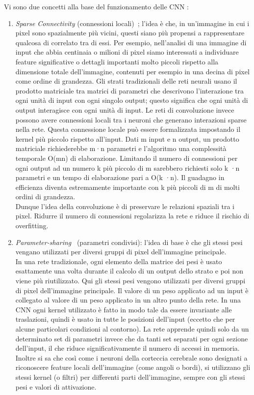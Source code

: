 Vi sono due concetti alla base del funzionamento delle CNN :\\
\begin{enumerate}
     \item \emph{Sparse Connectivity} (connessioni locali)~\cite{sparse}; l’idea è che, in un'immagine in cui i pixel sono spazialmente più vicini, questi siano
 più propensi a rappresentare
 qualcosa di correlato tra di essi. 
Per esempio, nell’analisi di una immagine di input che abbia centinaia o milioni di pixel 
siamo interessati a individuare feature significative o dettagli importanti molto piccoli
 rispetto alla dimensione totale dell’immagine, contenuti per esempio in una decina di pixel 
 come ordine di grandezza.
Gli strati tradizionali delle reti neurali usano il prodotto matriciale tra matrici di parametri
 che descrivono l’interazione tra ogni unità di input con ogni singolo output; questo significa
  che ogni unità di output interagisce con ogni unità di input.
   Le reti di convoluzione invece possono avere connessioni locali tra i neuroni che generano 
   interazioni sparse nella rete. Questa connessione locale può essere formalizzata impostando 
   il kernel più piccolo rispetto all'input. 
Dati m input e n output, un prodotto matriciale richiederebbe m·n parametri e l’algoritmo 
una complessità temporale O(mn) di elaborazione. Limitando il numero di connessioni per ogni 
output ad un numero k più piccolo di m sarebbero richiesti solo k ·n parametri e un tempo di 
elaborazione pari a O(k ·n). Il guadagno in efficienza diventa estremamente importante con k
 più piccoli di m di molti ordini di grandezza.\\
  Dunque l’idea della convoluzione è di preservare le relazioni spaziali tra i pixel. 
Ridurre il numero di connessioni regolarizza la rete e riduce il rischio di overfitting. 

\item \emph{Parameter-sharing}~\cite{max-pool} (parametri condivisi): l'idea di base è che gli stessi pesi
 vengano utilizzati per diversi gruppi di pixel dell’immagine principale.\\
In una rete tradizionale, ogni elemento della matrice dei pesi è usato esattamente
 una volta durante il calcolo di un output dello strato e poi non viene più riutilizzato. 
 Qui gli stessi pesi vengono utilizzati per diversi gruppi di pixel dell’immagine principale.
  Il valore di un peso applicato ad un input è collegato al valore di un peso applicato in 
  un altro punto della rete. In una CNN ogni kernel utilizzato è fatto in modo tale da essere 
  invariante alle traslazioni, quindi è usato in tutte le posizioni dell’input 
  (eccetto che per alcune particolari condizioni al contorno). 
  La rete apprende quindi solo da un determinato set di parametri invece che da tanti 
  set separati per ogni sezione dell’input, il che riduce significativamente 
  il numero di accessi in memoria.  Inoltre si sa che così come i neuroni della corteccia
   cerebrale sono designati a riconoscere feature locali dell’immagine (come angoli o bordi), 
   si utilizzano gli stessi kernel (o filtri) per differenti parti dell’immagine, 
   sempre con gli stessi pesi e valori di attivazione. 

\end{enumerate}
